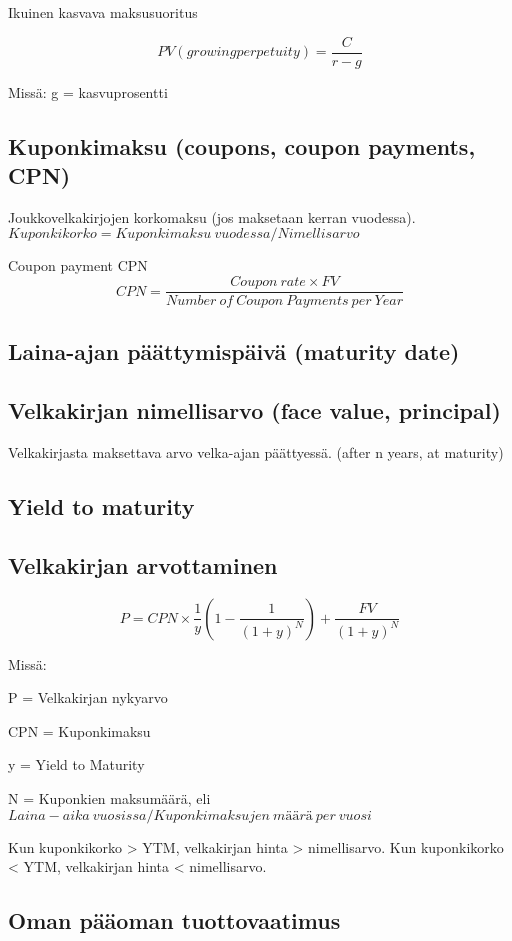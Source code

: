 \documentclass[a4paper]{article}
\begin{document}
Ikuinen kasvava maksusuoritus

\[
PV (growing perpetuity) = \frac{C}{r - g}
\]

Missä: g = kasvuprosentti

\subsection{Kuponkimaksu (coupons, coupon payments, CPN)}

Joukkovelkakirjojen korkomaksu (jos maksetaan kerran vuodessa). $Kuponkikorko = Kuponkimaksu\ vuodessa / Nimellisarvo$

Coupon payment CPN
\[
    CPN = \frac{Coupon\ rate \times FV}{Number\ of\ Coupon\ Payments\ per\ Year}
\]

\subsection{Laina-ajan päättymispäivä (maturity date)}

\subsection{Velkakirjan nimellisarvo (face value, principal)}

Velkakirjasta maksettava arvo velka-ajan päättyessä. (after n years, at maturity)

\subsection{Yield to maturity}

\subsection{Velkakirjan arvottaminen}

\[
    P = CPN \times \frac{1}{y} (1 - \frac{1}{(1 + y)^N}) + \frac{FV}{(1 + y)^N}
\]

Missä:

P = Velkakirjan nykyarvo

CPN = Kuponkimaksu

y = Yield to Maturity

N = Kuponkien maksumäärä, eli $Laina-aika\ vuosissa / Kuponkimaksujen\ määrä\ per\ vuosi$

Kun kuponkikorko > YTM, velkakirjan hinta > nimellisarvo. Kun kuponkikorko < YTM, velkakirjan hinta < nimellisarvo.

\subsection{Oman pääoman tuottovaatimus}
\end{document}
